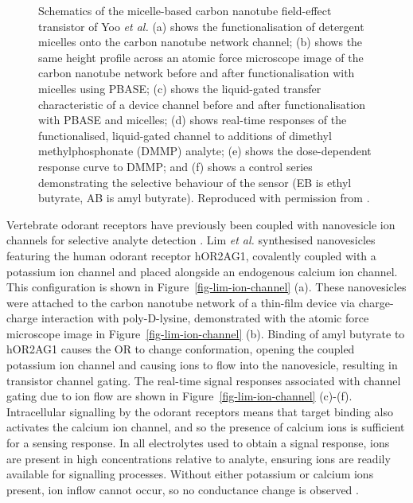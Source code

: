 \documentclass[
  a4paper,
]{scrbook}
\begin{document}
\begin{figure}
\caption[Schematics of the micelle-based carbon nanotube field-effect
transistor of Yoo \emph{et al.}]{\label{fig-yoo-micelle}Schematics of
the micelle-based carbon nanotube field-effect transistor of Yoo
\emph{et al.} (a) shows the functionalisation of detergent micelles onto
the carbon nanotube network channel; (b) shows the same height profile
across an atomic force microscope image of the carbon nanotube network
before and after functionalisation with micelles using PBASE; (c) shows
the liquid-gated transfer characteristic of a device channel before and
after functionalisation with PBASE and micelles; (d) shows real-time
responses of the functionalised, liquid-gated channel to additions of
dimethyl methylphosphonate (DMMP) analyte; (e) shows the dose-dependent
response curve to DMMP; and (f) shows a control series demonstrating the
selective behaviour of the sensor (EB is ethyl butyrate, AB is amyl
butyrate). Reproduced with permission from \autocite{Yoo2022}.}

\end{figure}

Vertebrate odorant receptors have previously been coupled with
nanovesicle ion channels for selective analyte detection
\autocite{Lim2015,Dung2018}. Lim \emph{et al.} synthesised nanovesicles
featuring the human odorant receptor hOR2AG1, covalently coupled with a
potassium ion channel and placed alongside an endogenous calcium ion
channel. This configuration is shown in Figure~\ref{fig-lim-ion-channel}
(a). These nanovesicles were attached to the carbon nanotube network of
a thin-film device via charge-charge interaction with poly-D-lysine,
demonstrated with the atomic force microscope image in
Figure~\ref{fig-lim-ion-channel} (b). Binding of amyl butyrate to
hOR2AG1 causes the OR to change conformation, opening the coupled
potassium ion channel and causing ions to flow into the nanovesicle,
resulting in transistor channel gating. The real-time signal responses
associated with channel gating due to ion flow are shown in
Figure~\ref{fig-lim-ion-channel} (c)-(f). Intracellular signalling by
the odorant receptors means that target binding also activates the
calcium ion channel, and so the presence of calcium ions is sufficient
for a sensing response. In all electrolytes used to obtain a signal
response, ions are present in high concentrations relative to analyte,
ensuring ions are readily available for signalling processes. Without
either potassium or calcium ions present, ion inflow cannot occur, so no
conductance change is observed \autocite{Lim2015}.
\end{document}
